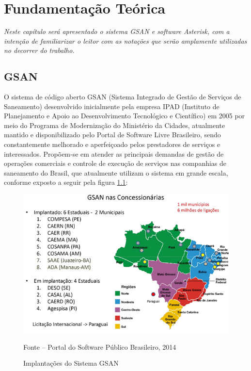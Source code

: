 \chapter[Fundamentação Teórica]{\textbf{F}undamentação \textbf{T}eórica}

\textit{Neste capítulo será apresentado o sistema GSAN e software Asterisk, com a intenção de familiarizar o leitor com as notações que serão amplamente utilizadas no decorrer do trabalho.}


\section{GSAN}
O sistema de código aberto GSAN (Sistema Integrado de Gestão de Serviços de Saneamento) desenvolvido inicialmente pela empresa IPAD (Instituto de Planejamento e Apoio ao Desenvolvimento Tecnológico e Científico) em 2005 por meio do Programa de Modernização do Ministério da Cidades, atualmente mantido e disponibilizado pelo Portal de Software Livre Brasileiro, sendo constantemente melhorado e aperfeiçoado pelos prestadores de serviços e interessados. Propõem-se em atender as principais demandas de gestão de operações comerciais e controle de execução de serviços nas companhias de saneamento do Brasil, que atualmente utilizam o sistema em grande escala, conforme exposto a seguir pela figura \ref{figura:implantacaoSistemaGSAN}:


\begin{figure}[H]
	\centering
	\includegraphics{figuras/implantacaoGSAN.png}
	\caption{Implantações do Sistema GSAN}	
	\label{figura:implantacaoSistemaGSAN}
	Fonte – Portal do Software Público Brasileiro, 2014
\end{figure}


